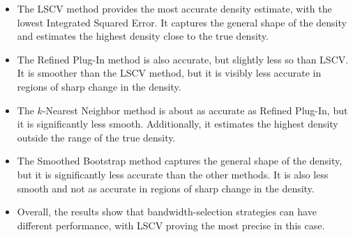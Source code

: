 \documentclass{article}
\begin{document}
\begin{itemize}
  \item The LSCV method provides the most accurate density estimate, with the lowest Integrated Squared Error. It captures the general shape of the density and estimates the highest density close to the true density.
  \item The Refined Plug-In method is also accurate, but slightly less so than LSCV. It is smoother than the LSCV method, but it is visibly less accurate in regions of sharp change in the density.
  \item The \(k\)-Nearest Neighbor method is about as accurate as Refined Plug-In, but it is significantly less smooth. Additionally, it estimates the highest density outside the range of the true density.
  \item The Smoothed Bootstrap method captures the general shape of the density, but it is significantly less accurate than the other methods. It is also less smooth and not as accurate in regions of sharp change in the density.
  \item Overall, the results show that bandwidth-selection strategies can have different performance, with LSCV proving the most precise in this case.
\end{itemize}
\end{document}
